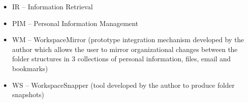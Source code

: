 
\begin{itemize}
\item IR -- Information Retrieval
\item PIM -- Personal Information Management
\item WM -- WorkspaceMirror	(prototype integration mechanism developed by the author which allows the user to mirror organizational changes between the folder structures in 3 collections of personal information, files, email and bookmarks)
\item WS -- WorkspaceSnapper (tool developed by the author to produce folder snapshots)
\end{itemize}



%
%
%
%









